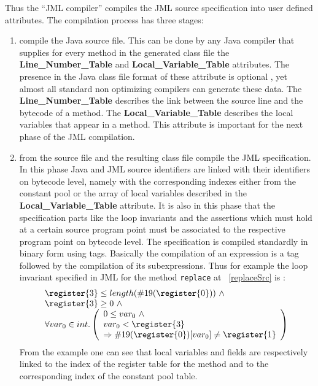 Thus the ``JML compiler'' compiles the JML source specification into user defined attributes. The compilation process has three stages:
\begin{enumerate}
\item compile the Java source file. This can be done by any Java compiler that supplies for every method in the generated class file the \textbf{Line\_Number\_Table} and \textbf{Local\_Variable\_Table}  attributes. The presence in the Java class file format of these attribute is optional \cite{VMSpec}, yet almost all standard non optimizing compilers can generate these data. The \textbf{Line\_Number\_Table} describes the link between the source line and the bytecode of a method.  The \textbf{Local\_Variable\_Table} describes the local variables that appear in a method. This attribute is important for the next phase of the JML compilation.
\item from the source file and the resulting class file compile the JML specification. In this phase Java and JML source identifiers are linked with their identifiers on bytecode level, namely with the corresponding indexes either from the constant pool or the array of local variables described in the \textbf{Local\_Variable\_Table} attribute. It is also in this phase that the specification parts like the loop invariants and the assertions which must hold at a certain source program point must be associated to the respective program point on bytecode level. The specification
is compiled standardly in binary form using tags. Basically the compilation of an expression is a tag followed by the compilation of its subexpressions. 
Thus for example the loop invariant specified in JML for the method \texttt{replace} at ~\ref{replaceSrc} is :
$$
\begin{array}{l}
\register{3} \le length(\#19(\register{0})) \ \wedge \\
\register{3} \ge 0  \ \wedge \\ 
       \forall  var_0 \in int . \left(\begin{array}{l} 0 \le var_0 \ \wedge \\ var_0 < \register{3}  \\
                \Rightarrow  \#19(\register{0})[var_0] \neq \register{1} \end{array} \right)
\end{array}
$$
From the example one can see that local variables and  fields are respectively linked to the index of the register table for the method and to the corresponding index of the constant pool table. 

\end{enumerate}
